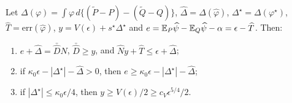 \begin{lemma}[Comparison]
\label{lem:lapcompare}
Let $\Delta(\varphi)=\int\varphi\,d\{(\tilde P-P)-(\tilde Q-Q)\}$, $\widehat\Delta=\Delta(\widehat\varphi)$,
$\Delta^\star=\Delta(\varphi^\star)$, $\widehat T=\mathrm{err}(\widehat\varphi)$, $y=V(\epsilon)+s^\star\Delta^\star$ and
$e=\mathbb{E}_P\widehat{\psi}-\mathbb{E}_Q\widehat{\psi}-\alpha=\epsilon-\widehat T$. Then:
\begin{enumerate}[label=(\roman*),leftmargin=*]
\item $e+\widehat\Delta=\bar{\widehat D}\widehat N$, $\bar{\widehat D}\ge y$, and $\widehat Ny+\widehat T\le\epsilon+\widehat\Delta$;
\item if $\kappa_0\epsilon-|\Delta^\star|-\widehat\Delta>0$, then $e\ge\kappa_0\epsilon-|\Delta^\star|-\widehat\Delta$;
\item if $|\Delta^\star|\le\kappa_0\epsilon/4$, then $y\ge V(\epsilon)/2\ge c_V\epsilon^{5/4}/2$.
\end{enumerate}
\end{lemma}


